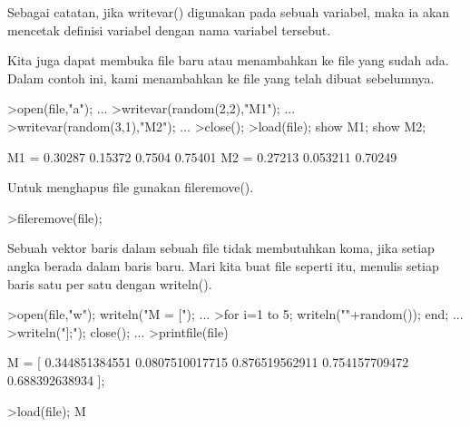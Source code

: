 \documentclass{article}
\begin{document}
\begin{eulernotebook}
\begin{eulercomment}
Sebagai catatan, jika writevar() digunakan pada sebuah variabel, maka
ia akan mencetak definisi variabel dengan nama variabel tersebut.
\end{eulercomment}
\begin{eulercomment}
Kita juga dapat membuka file baru atau menambahkan ke file yang sudah
ada. Dalam contoh ini, kami menambahkan ke file yang telah dibuat
sebelumnya.
\end{eulercomment}
\begin{eulerprompt}
>open(file,"a"); ...
>writevar(random(2,2),"M1"); ...
>writevar(random(3,1),"M2"); ...
>close();
>load(file); show M1; show M2;
\end{eulerprompt}
\begin{euleroutput}
  M1 = 
    0.30287   0.15372 
     0.7504   0.75401 
  M2 = 
    0.27213 
   0.053211 
    0.70249 
\end{euleroutput}
\begin{eulercomment}
Untuk menghapus file gunakan fileremove().
\end{eulercomment}
\begin{eulerprompt}
>fileremove(file);
\end{eulerprompt}
\begin{eulercomment}
Sebuah vektor baris dalam sebuah file tidak membutuhkan koma, jika
setiap angka berada dalam baris baru. Mari kita buat file seperti itu,
menulis setiap baris satu per satu dengan writeln().
\end{eulercomment}
\begin{eulerprompt}
>open(file,"w"); writeln("M = ["); ...
>for i=1 to 5; writeln(""+random()); end; ...
>writeln("];"); close(); ...
>printfile(file)
\end{eulerprompt}
\begin{euleroutput}
  M = [
  0.344851384551
  0.0807510017715
  0.876519562911
  0.754157709472
  0.688392638934
  ];
\end{euleroutput}
\begin{eulerprompt}
>load(file); M
\end{eulerprompt}
\begin{euleroutput}

\end{euleroutput}
\end{eulernotebook}
\end{document}

